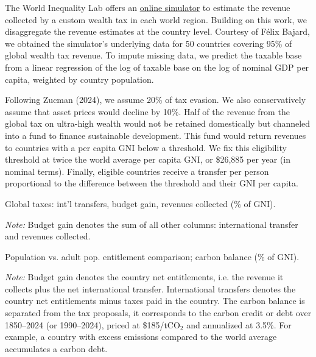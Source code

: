 \documentclass[12pt,english]{article}
\begin{document}
The World Inequality Lab offers an \href{https://wid.world/world-wealth-tax-simulator/}{online simulator} to estimate the revenue collected by a custom wealth tax in each world region. Building on this work, we disaggregate the revenue estimates at the country level. Courtesy of Félix Bajard, we obtained the simulator's underlying data for 50 countries covering 95\% of global wealth tax revenue. To impute missing data, we predict the taxable base from a linear regression of the log of taxable base on the log of nominal GDP per capita, weighted by country population. 

Following Zucman (2024)\cite{zucman_blueprint_2024}, we assume 20\% of tax evasion. We also conservatively assume that asset prices would decline by 10\%. Half of the revenue from the global tax on ultra-high wealth would not be retained domestically but channeled into a fund to finance sustainable development. This fund would return revenues to countries with a per capita GNI below a threshold. We fix this eligibility threshold at twice the world average per capita GNI, or \$26,885 per year (in nominal terms). Finally, eligible countries receive a transfer per person %
proportional to the difference between the threshold and their GNI per capita.

\begin{table}[!h]
  \caption{\label{tab:transfers_gain}Global taxes: int'l transfers, budget gain, revenues collected (\% of GNI). }
  \makebox[\textwidth][c]{
} 
{\footnotesize \textit{Note:}  Budget gain denotes the sum of all other columns: international transfer and revenues collected. %
}
\end{table}

\begin{table}[!h]
  \vspace{-1cm}
  \caption{\label{tab:transfers_balance}Population vs. adult pop. entitlement comparison; carbon balance (\% of GNI). }
  \makebox[\textwidth][c]{
} 
{\footnotesize \textit{Note:} Budget gain denotes the country net entitlements, i.e. the revenue it collects plus the net international transfer. International transfers denotes the country net entitlements minus taxes paid in the country. The carbon balance is separated from the tax proposals, it corresponds to the carbon credit or debt over 1850--2024 (or 1990--2024), priced at \$185/tCO$_\text{2}$ and annualized at 3.5\%. For example, a country with excess emissions compared to the world average accumulates a carbon debt. %
}
\end{table}
\end{document}
